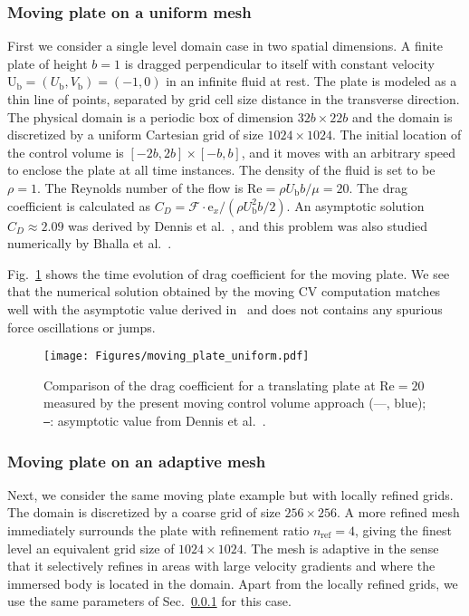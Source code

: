 \documentclass[review]{elsarticle}
\renewcommand{\vec}[1]{\bm{\mathrm{#1}}}
\def \e{\vec{e}}
\def \U{\vec{U}}
\def \cF{\vec{\mathcal{F}}}
\def \U{\vec{U}}
\def \Ub{\U_{\text{b}}}
\def \e{\vec{e}}
\def \nref{n_{\text{ref}}}
\def \Re{\text{Re}}
\begin{document}
\subsubsection{Moving plate on a uniform mesh}
\label{sec_translating_plate_uniform_mesh}
First we consider a single level domain case in two spatial dimensions. A finite plate of 
height $b = 1$ is dragged perpendicular to itself with constant velocity 
$\Ub = (U_\text{b}, V_\text{b}) = (-1,0)$ in an infinite fluid at rest. The plate is modeled 
as a thin line of points, separated by grid cell size distance in the transverse direction.
The physical domain is a periodic box of dimension $32b \times 22b$ and the domain
is discretized by a uniform Cartesian grid of size $1024 \times 1024$. The initial 
location of the control volume is $[-2b,2b] \times [-b,b]$, and it moves with an arbitrary 
speed to enclose the plate at all time instances. The density of the fluid is set to be $\rho  = 1$.
The Reynolds number of the flow 
is $\Re = \rho U_\text{b} b/\mu = 20$. The drag coefficient is calculated as 
$C_D = \cF \cdot \e_x/(\rho U_\text{b}^2 b/2)$. An asymptotic
solution $C_D \approx 2.09$ was derived by Dennis et al.~\cite{Dennis93}, and this
problem was also studied numerically by Bhalla et al.~\cite{Bhalla13}.

Fig.~\ref{fig_moving_plate_uniform} shows the time evolution of drag coefficient
for the moving plate. We see that the numerical solution obtained by the moving CV
computation matches well with the asymptotic value derived in~\cite{Dennis93} and does 
not contains any spurious force oscillations or jumps.


\begin{figure}[H]
  \centering
    \texttt{[image: Figures/moving\_plate\_uniform.pdf]}
  \caption{Comparison of the drag coefficient for a translating 
    plate at $\Re = 20$ measured by the present moving control
    volume approach (---, blue); 
     \texttt{---}: asymptotic value from Dennis et al.~\cite{Dennis93}.}
  \label{fig_moving_plate_uniform}
\end{figure}


\subsubsection{Moving plate on an adaptive mesh} \label{sec_translating_plate}
Next, we consider the same moving plate example but with locally refined grids. The domain 
is discretized by a coarse grid of size $256 \times 256$. A more refined mesh immediately 
surrounds the plate with refinement ratio $\nref = 4$, giving the finest level an 
equivalent grid size of $1024 \times 1024$. The mesh is adaptive in the sense that it 
selectively refines in areas with large velocity gradients and where the immersed body is
located in the domain. Apart from the locally refined grids, we use the same parameters  
of Sec.~\ref{sec_translating_plate_uniform_mesh} for this case.
\end{document}
